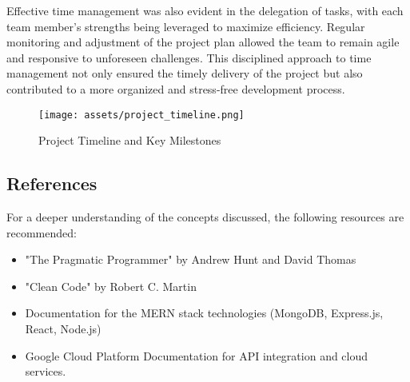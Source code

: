 Effective time management was also evident in the delegation of tasks, with each team member’s strengths being leveraged to maximize efficiency. Regular monitoring and adjustment of the project plan allowed the team to remain agile and responsive to unforeseen challenges. This disciplined approach to time management not only ensured the timely delivery of the project but also contributed to a more organized and stress-free development process.

\begin{figure}[h]
    \centering
    \texttt{[image: assets/project\_timeline.png]}
    \caption{Project Timeline and Key Milestones}
    \label{fig:project_timeline}
\end{figure}

\subsection{References}
For a deeper understanding of the concepts discussed, the following resources are recommended:
\begin{itemize}
    \item "The Pragmatic Programmer" by Andrew Hunt and David Thomas
    \item "Clean Code" by Robert C. Martin
    \item Documentation for the \gls{MERN} stack technologies (MongoDB, Express.js, React, Node.js)
    \item Google Cloud Platform Documentation for API integration and cloud services.
\end{itemize}
